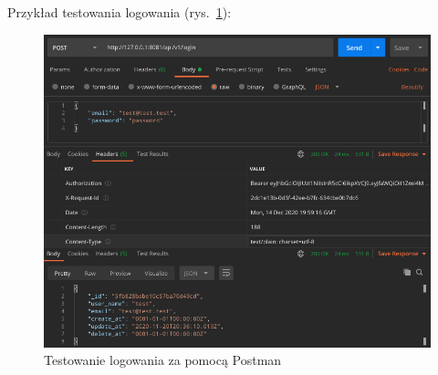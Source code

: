 Przykład testowania logowania (rys.~\ref{fig:postman_login1}):
\begin{figure}[ht]
    \centering
        \includegraphics[width=0.9\linewidth]{rys04/postman_login.png}
        \caption{Testowanie logowania za pomocą Postman}
    \label{fig:postman_login1}
\end{figure}

